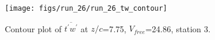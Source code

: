 \begin{figure}[H]
\centering
\texttt{[image: figs/run\_26/run\_26\_tw\_contour]}
\caption{Contour plot of $\overline{t^\prime w^\prime}$ at $z/c$=7.75, $V_{free}$=24.86, station 3.}
\label{fig:run_26_tw_contour}
\end{figure}



